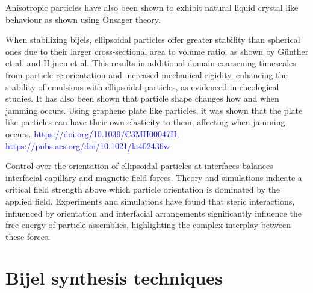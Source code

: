 Anisotropic particles have also been shown to exhibit natural liquid crystal like behaviour as shown using Onsager theory. 

When stabilizing bijels, ellipsoidal particles offer greater stability than spherical ones due to their larger cross-sectional area to volume ratio, as shown by Günther et al. and Hijnen et al. \cite{gunther_timescales_2014, hijnen_bijels_2015} This results in additional domain coarsening timescales from particle re-orientation and increased mechanical rigidity, enhancing the stability of emulsions with ellipsoidal particles, as evidenced in rheological studies. \cite{gunther_timescales_2014, daware_emulsions_2015, witt_bijel_2013} 
It has also been shown that particle shape changes how and when jamming occurs. Using graphene plate like particles, it was shown that the plate like particles can have their own elasticity to them, affecting when jamming occurs. \textcolor{blue}{https://doi.org/10.1039/C3MH00047H, https://pubs.acs.org/doi/10.1021/la402436w}

Control over the orientation of ellipsoidal particles at interfaces balances interfacial capillary and magnetic field forces. \cite{bresme_orientational_2007, davies_assembling_2014} Theory and simulations indicate a critical field strength above which particle orientation is dominated by the applied field. \cite{bresme_orientational_2007, davies_assembling_2014} Experiments and simulations have found that steric interactions, influenced by orientation and interfacial arrangements significantly influence the free energy of particle assemblies, highlighting the complex interplay between these forces. \cite{morgan_understanding_2013, newton_influence_2014, newton_capillary_2018}


\section{Bijel synthesis techniques}

